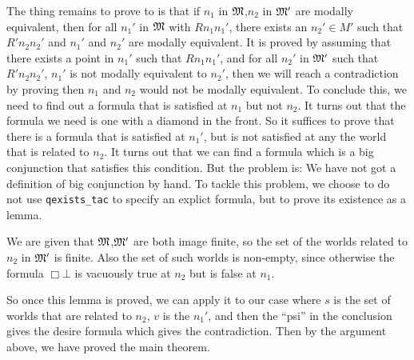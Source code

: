 \documentclass{report}
\renewcommand{\HOLinline}[1]{\ensuremath{#1}}
\begin{document}
The thing remains to prove to is that if $n_1$ in \HOLinline{\HOLFreeVar{\ensuremath{\mathfrak{M}}}},$n_2$ in \HOLinline{\HOLFreeVar{\ensuremath{\mathfrak{M}'}}} are modally equivalent, then for all $n_1'$ in \HOLinline{\HOLFreeVar{\ensuremath{\mathfrak{M}}}} with $Rn_1n_1'$, there exists an $n_2'\in M'$ such that $R'n_2n_2'$ and $n_1'$ and $n_2'$ are modally equivalent. It is proved by assuming that there exists a point in $n_1'$ such that $Rn_1n_1'$, and for all $n_2'$ in \HOLinline{\HOLFreeVar{\ensuremath{\mathfrak{M}'}}} such that $R'n_2n_2'$, $n_1'$ is not modally equivalent to $n_2'$, then we will reach a contradiction by proving then $n_1$ and $n_2$ would not be modally equivalent. To conclude this, we need to find out a formula that is satisfied at $n_1$ but not $n_2$. It turns out that the formula we need is one with a diamond in the front. So it suffices to prove that there is a formula that is satisfied at $n_1'$, but is not satisfied at any the world that is related to $n_2$. It turns out that we can find a formula which is a big conjunction that satisfies this condition. But the problem is: We have not got a definition of big conjunction by hand. To tackle this problem, we choose to do not use \texttt{qexists_tac} to specify an explict formula, but to prove its existence as a lemma.


We are given that \HOLinline{\HOLFreeVar{\ensuremath{\mathfrak{M}}}},\HOLinline{\HOLFreeVar{\ensuremath{\mathfrak{M}'}}} are both image finite, so the set of the worlds related to $n_2$ in \HOLinline{\HOLFreeVar{\ensuremath{\mathfrak{M}'}}} is finite. Also the set of such worlds is non-empty, since otherwise the formula $\Box \bot$ is vacuously true at $n_2$ but is false at $n_1$. 

So once this lemma is proved, we can apply it to our case where $s$ is the set of worlds that are related to $n_2$, $v$ is the $n_1'$, and then the ``psi'' in the conclusion gives the desire formula which gives the contradiction. Then by the argument above, we have proved the main theorem.
                 
\end{document}
